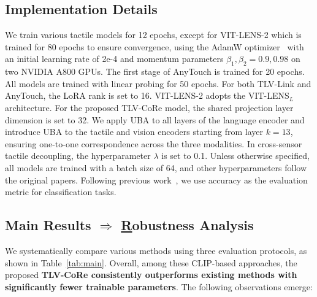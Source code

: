 \documentclass[letterpaper]{article} %
\theoremstyle{definition}                %
\theoremstyle{plain}                     %
\theoremstyle{remark}                    %
\begin{document}
\subsection{Implementation Details}
\label{sec:implementation}

We train various tactile models for 12 epochs, except for VIT-LENS-2 which is trained for 80 epochs to ensure convergence, using the AdamW optimizer~\cite{loshchilov2017decoupled} with an initial learning rate of 2e-4 and momentum parameters $\beta_1, \beta_2 = 0.9, 0.98$ on two NVIDIA A800 GPUs. The first stage of AnyTouch is trained for 20 epochs. All models are trained with linear probing for 50 epochs. For both TLV-Link and AnyTouch, the LoRA rank is set to 16. VIT-LENS-2 adopts the VIT-LENS$_L$ architecture. For the proposed TLV-CoRe model, the shared projection layer dimension is set to 32. We apply UBA to all layers of the language encoder and introduce UBA to the tactile and vision encoders starting from layer $k=13$, ensuring one-to-one correspondence across the three modalities. In cross-sensor tactile decoupling, the hyperparameter $\lambda$ is set to 0.1. Unless otherwise specified, all models are trained with a batch size of 64, and other hyperparameters follow the original papers. Following previous work~\cite{yang2022touch, yang2024binding, cheng2025touch100k, feng2025anytouch, lei2024vit}, we use accuracy as the evaluation metric for classification tasks.



\subsection{Main Results $\Rightarrow$ \underline{R}obustness Analysis}
\label{sec:main}


We systematically compare various methods using three evaluation protocols, as shown in Table~\ref{tab:main}. Overall, among these CLIP-based approaches, the proposed \textbf{TLV-CoRe consistently outperforms existing methods with significantly fewer trainable parameters}. The following observations emerge:
\end{document}
